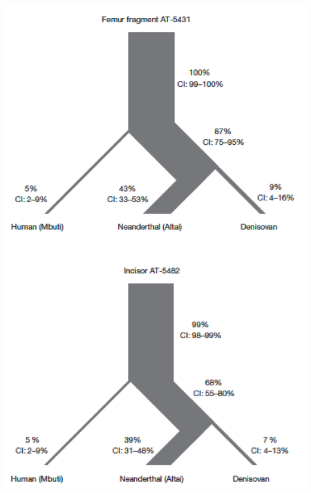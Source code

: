 \begin{frame}
\begin{columns}[c]
        \includegraphics[width=\textwidth]{images/sima_shared} \\
    \end{columns}  
\end{frame}